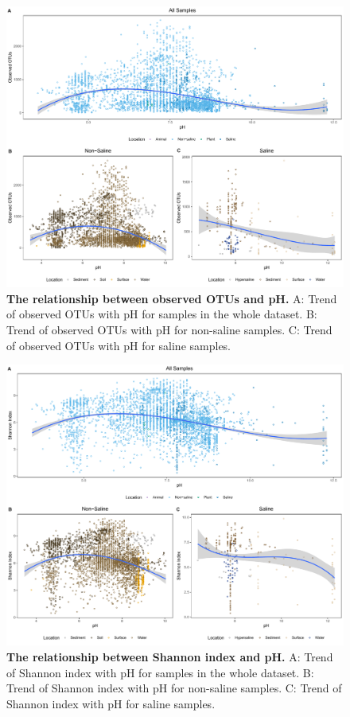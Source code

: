 \begin{figure}[H]
    \centering
    \includegraphics[scale=0.33]{./Figures/OO_pH_empo2}
    \caption{\textbf{The relationship between observed OTUs and pH.} A: Trend of observed OTUs with pH for samples in the whole dataset. B: Trend of observed OTUs with pH for non-saline samples. C: Trend of observed OTUs with pH for saline samples.}
    \label{fig:OO_pH}
\end{figure}

\begin{figure}[H]
    \centering
    \includegraphics[scale=0.33]{./Figures/Shan_pH_empo2}
    \caption{\textbf{The relationship between Shannon index and pH.} A: Trend of Shannon index with pH for samples in the whole dataset. B: Trend of Shannon index with pH for non-saline samples. C: Trend of Shannon index with pH for saline samples.}
    \label{fig:Shan_pH}
\end{figure}

